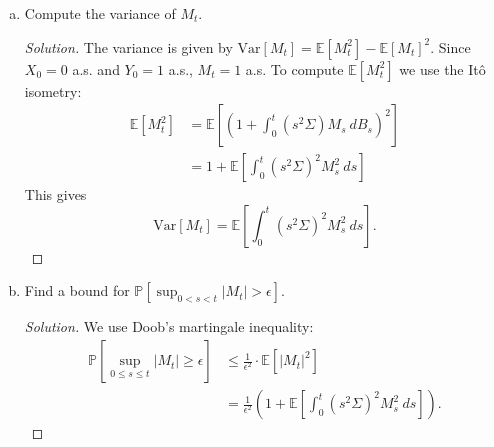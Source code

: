\documentclass[11pt,letterpaper]{report}
\newcommand{\E}{\mathbb{E}}
\newcommand{\Prob}{\mathbb{P}}
\newcommand{\Var}{\text{Var}}
\newenvironment{solution}
{\begin{proof}[Solution]}
{\end{proof}}
\begin{document}
\begin{enumerate}[(a)]
	\item Compute the variance of $M_t$.
	\begin{solution}
		The variance is given by $\Var[M_t] = \E[M_t^2] - \E[M_t]^2$. Since $X_0 = 0$ a.s. and $Y_0 = 1$ a.s., $M_t = 1$ a.s. To compute $\E[M_t^2]$ we use the It\^o isometry:
		\begin{align*}
			\E[M_t^2] &= \E\left[ \left(1 + \int_0^t(s^2\Sigma)M_s\ dB_s  \right)^2 \right]\\
			&= 1 + \E\left[\int_0^t (s^2\Sigma)^2M_s^2\ ds \right]
		\end{align*}
		This gives
		\[
		\Var[M_t] = \E \left[ \int_0^t(s^2\Sigma)^2M_s^2\ ds \right].
		\]
	\end{solution}

	\item Find a bound for $\Prob[\sup_{0<s<t}|M_t|>\epsilon]$.
	\begin{solution}
		We use Doob's martingale inequality:
		\begin{align*}
			\Prob\left[ \sup_{0\leq s\leq t} |M_t| \geq \epsilon\right] &\leq \frac{1}{\epsilon^2}\cdot \E[|M_t|^2]\\
			&= \frac{1}{\epsilon^2}\left(1 + \E\left[\int_0^t(s^2\Sigma)^2M_s^2\ ds \right] \right).
		\end{align*}
	\end{solution}

\end{enumerate}
\end{document}
